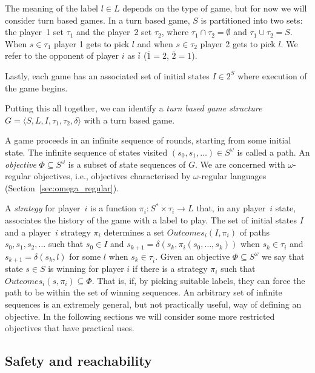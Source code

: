 The meaning of the label $l \in L$ depends on the type of game, but for now we will consider turn based games. In a turn based game, $S$ is partitioned into two sets: the player~1 set $\tau_1$ and the player~2 set $\tau_2$, where $\tau_1 \cap \tau_2 = \emptyset$ and $ \tau_1 \cup \tau_2 = S$. When $s \in \tau_1$ player 1 gets to pick $l$ and when $s \in \tau_2$ player 2 gets to pick $l$. We refer to the opponent of player $i$ as $\overline{i}$ ($\overline{1} = 2$, $\overline{2} = 1$).

Lastly, each game has an associated set of initial states $I \in 2^S$ where execution of the game begins.

Putting this all together, we can identify a \emph{turn based game structure} $G = \langle S,L,I,\tau_1,\tau_2,\delta \rangle$ with a turn based game.

A game proceeds in an infinite sequence of rounds, starting from some initial state. The infinite sequence of states visited $(s_0, s_1,\ldots) \in S^\omega$ is called a path. An \emph{objective} $\Phi \subseteq S^\omega$ is a subset of state sequences of $G$. We are concerned with $\omega$-regular objectives, i.e., objectives characterised by $\omega$-regular languages (Section~\ref{sec:omega_regular}). 

A \emph{strategy} for player~$i$ is a function $\pi_i : S^* \times \tau_i \rightarrow L$ that, in any player~$i$ state, associates the history of the game with a label to play. The set of initial states $I$ and a player~$i$ strategy $\pi_i$ determines a set $Outcomes_i(I, \pi_i)$ of paths $s_0, s_1, s_2, \ldots $ such that $s_0 \in I$ and $s_{k+1} = \delta(s_k, \pi_i(s_0,\ldots,s_k))$ when $s_k \in \tau_i$ and $s_{k+1} = \delta(s_k, l)$ for some $l$ when $s_k \in \tau_{\overline{i}}$.  Given an objective $\Phi \subseteq S^\omega$ we say that state $s \in S$ is winning for player $i$ if there is a strategy $\pi_i$ such that $Outcomes_i({s}, \pi_i) \subseteq \Phi$. That is, if, by picking suitable labels, they can force the path to be within the set of winning sequences. An arbitrary set of infinite sequences is an extremely general, but not practically useful, way of defining an objective. In the following sections we will consider some more restricted objectives that have practical uses.

\subsection{Safety and reachability}


